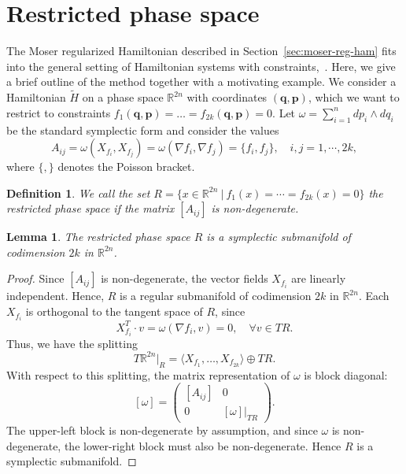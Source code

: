 \documentclass[pdflatex,sn-mathphys-ay]{sn-jnl}%
\theoremstyle{thmstyleone}%
\newtheorem{lemma}[theorem]{Lemma}%
\theoremstyle{thmstyletwo}%
\theoremstyle{thmstylethree}%
\newtheorem{definition}{Definition}%
\newcommand{\R}{{\mathbb{R}}}
\begin{document}
\section{Restricted phase space}
\label{sec:restricted-phase-space}
The Moser regularized Hamiltonian described in Section~\ref{sec:moser-reg-ham} fits into the general setting of Hamiltonian systems with constraints,~\cite{dirac_generalized_1950,dirac_lectures_1967}. Here, we give a brief outline of the method together with a motivating example.
We consider a Hamiltonian $\tilde{H}$ on a phase space $\R^{2n}$ with coordinates $(\mathbf{q},\mathbf{p})$, which we want to restrict to constraints $f_1(\mathbf{q},\mathbf{p})=\ldots=f_{2k}(\mathbf{q},\mathbf{p})=0$. Let $\omega=\sum_{i=1}^n dp_i\wedge dq_i$ be the standard symplectic form and consider the values
\begin{equation}
\label{eqn:poisson-bracket-matrix}
A_{ij} = \omega(X_{f_i}, X_{f_j}) = \omega(\nabla f_i, \nabla f_j) = \{f_i, f_j\}, \quad i,j=1,\cdots,2k,
\end{equation}
where $\{,\}$ denotes the Poisson bracket.
\begin{definition}
We call the set $R=\{ x\in \R^{2n}~|~ f_1(x)=\cdots=f_{2k}(x) =0 \}$ the \emph{restricted phase space} if the matrix $[A_{ij}]$ is non-degenerate.
\end{definition}
\begin{lemma}
The restricted phase space $R$ is a symplectic submanifold of codimension $2k$ in $\mathbb{R}^{2n}$.
\end{lemma}
\begin{proof}
Since $[A_{ij}]$ is non-degenerate, the vector fields $X_{f_i}$ are linearly independent. Hence, $R$ is a regular submanifold of codimension $2k$ in $\mathbb{R}^{2n}$. 
Each $X_{f_i}$ is orthogonal to the tangent space of $R$, since
\[
X_{f_i}^T \cdot v = \omega(\nabla f_i, v) = 0, \quad \forall v \in TR.
\]
Thus, we have the splitting
\[
T\mathbb{R}^{2n}|_R = \langle X_{f_1}, \ldots, X_{f_{2k}} \rangle \oplus TR.
\]
With respect to this splitting, the matrix representation of $\omega$ is block diagonal:
\[
[\omega] =
\begin{pmatrix}
[A_{ij}] & 0 \\
0 & [\omega]|_{T R}
\end{pmatrix}.
\]
The upper-left block is non-degenerate by assumption, and since $\omega$ is non-degenerate, the lower-right block must also be non-degenerate. Hence $R$ is a symplectic submanifold.
\end{proof}
\end{document}
